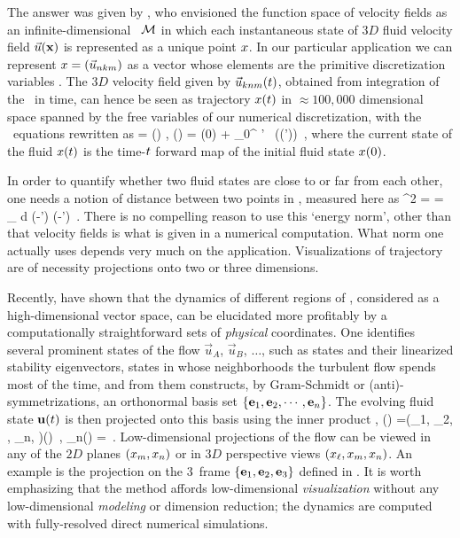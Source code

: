 The answer was given by \cite{hopf48}, who envisioned the function space
of {\NS} velocity fields as an infinite-dimensional \statesp\ ${\cal M}$ in
which each instantaneous state of $3D$ fluid velocity field $\vec{u}({\bf x})$ is
represented as a unique point $x$. In our particular application we
can represent $x = (\vec{u}_{nkm})$ as a vector whose elements are the
primitive discretization variables . The $3D$ velocity
field given by $\vec{u}_{knm}(t)$, obtained from integration of the
\NSe\ in time, can hence be seen as trajectory $x(t)$ in
$\approx 100,000$ dimensional space spanned by the free variables of our
numerical discretization, with the \NS\ equations 
rewritten as
\beq
   \dot{\ssp} = \vel(\ssp) ,
   \qquad
   \ssp(\zeit) = \ssp(0)
            + \int_0^\zeit \! \zeit' \, \vel(\ssp(\zeit'))
\,,
where the current state of the fluid $ x(t)$ is the time-$t$
forward map of the initial fluid state  $x(0)$.

In order to quantify whether two fluid states are close to or far from
each other, one needs a notion of distance between two points in
\statesp, measured here as
\beq
  ^2  =  =
\int_\bCell \! d \bx \;
(-') \cdot (-')
\,.
There is no compelling reason to use this {`energy norm'}, other than
that velocity fields is what is given in a numerical computation. What
norm one actually uses depends very much on the application.
Visualizations of trajectory  are of necessity
projections onto two or three dimensions.

Recently, \cite{GHCW07} have shown that the dynamics of different regions
of {\statesp}, considered as a high-dimensional vector space,
can be elucidated more profitably by a computationally
straight\-forward sets of \emph{physical} coordinates. One identifies
several prominent states of the flow $\vec{u}_A$, $\vec{u}_B$, $\dots$, such as
{\eqv} states and their linearized stability eigenvectors, states in whose neighborhoods the
turbulent flow spends most of the time, and from them constructs, by
Gram-Schmidt or (anti)-symmetrizations, an orthonormal basis set
$\{{\bf e}_1, {\bf e}_2, \cdots, {\bf e}_n\}$. The evolving fluid state ${\bf u}(t)$
is then projected onto this basis using the inner product
,
\beq
\ssp(\zeit) =(\ssp_1, \ssp_2, \cdots, \ssp_n, \cdots)(\zeit)
    \,,\qquad
\ssp_n(\zeit) = 
\,.
Low-dimensional projections of the flow can be viewed in any of the $2D$ planes
$(x_m, x_n)$ or in $3D$ perspective views $(x_{\ell},x_m,
x_n)$. An example is the  projection on
the $3$\dmn\ frame $\{{{\bf e}}_1,{{\bf e}}_2,{{\bf e}}_3\}$ defined in .
It is worth emphasizing that the method affords low-dimensional {\em
visualization} without any low-dimensional {\em modeling} or dimension
reduction; the dynamics are computed with fully-resolved direct numerical
simulations.

